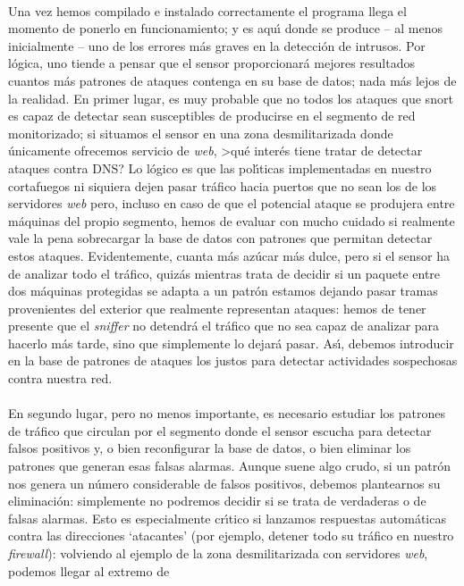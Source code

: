 \\Una vez hemos compilado e instalado correctamente el programa llega el momento
de ponerlo en funcionamiento; y es aqu\'{\i} donde se produce -- al menos
inicialmente -- uno de los errores m\'as graves en la detecci\'on de intrusos.
Por l\'ogica, uno tiende a pensar que el sensor proporcionar\'a mejores 
resultados cuantos m\'as patrones de ataques contenga en su base de datos; 
nada m\'as lejos de la realidad. En primer lugar, es muy probable que no todos 
los ataques que {\sc snort} es capaz de detectar sean susceptibles de 
producirse en el segmento de red monitorizado; si situamos el sensor en una
zona desmilitarizada donde \'unicamente ofrecemos servicio de {\it web}, >qu\'e
inter\'es tiene tratar de detectar ataques contra DNS? Lo l\'ogico es que 
las pol\'{\i}ticas implementadas en nuestro cortafuegos ni siquiera dejen
pasar tr\'afico hacia puertos que no sean los de los servidores {\it web} pero,
incluso en caso de que el potencial ataque se produjera entre m\'aquinas del 
propio segmento, hemos de evaluar con mucho cuidado si realmente vale la pena
sobrecargar la base de datos con patrones que permitan detectar estos ataques.
Evidentemente, cuanta m\'as az\'ucar m\'as dulce, pero si el sensor ha de 
analizar todo el tr\'afico, quiz\'as mientras trata de decidir si un paquete 
entre dos m\'aquinas protegidas se adapta a un patr\'on estamos dejando pasar
tramas provenientes del exterior que realmente representan ataques: hemos de
tener presente que el {\it sniffer} no detendr\'a el tr\'afico que no sea
capaz de analizar para hacerlo m\'as tarde, sino que simplemente lo dejar\'a
pasar. As\'{\i}, debemos introducir en la base de patrones de ataques los 
justos para detectar actividades sospechosas contra nuestra red.\\
\\En segundo lugar, pero no menos importante, es necesario estudiar los 
patrones de tr\'afico que circulan por el segmento donde el sensor escucha 
para detectar falsos positivos y, o bien reconfigurar la base de datos, o bien
eliminar los patrones que generan esas falsas alarmas. Aunque suene algo crudo,
si un patr\'on nos genera un n\'umero considerable de falsos positivos, debemos
plantearnos su eliminaci\'on: simplemente no podremos decidir si se trata de
verdaderas o de falsas alarmas. Esto es especialmente cr\'{\i}tico si lanzamos
respuestas autom\'aticas contra las direcciones `atacantes' (por ejemplo,
detener todo su tr\'afico en nuestro {\it firewall}): volviendo al ejemplo de
la zona desmilitarizada con servidores {\it web}, podemos llegar al extremo de 
